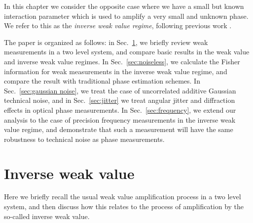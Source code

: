 In this chapter we consider the opposite case where we have a small but known interaction parameter which is used to amplify a very small and unknown phase.  We refer to this as the \emph{inverse weak value regime}, following previous work \cite{Starling2010a,Dressel2013,Lyons2015,Kofman2012}. 

The paper is organized as follows: in Sec.~\ref{sec:inverse weak values}, we briefly review weak measurements in a two level system, and compare basic results in the weak value and inverse weak value regimes.  In Sec.~\ref{sec:noiseless}, we calculate the Fisher information for weak measurements in the inverse weak value regime, and compare the result with traditional phase estimation schemes. In Sec.~\ref{sec:gaussian noise}, we treat the case of uncorrelated additive Gaussian technical noise, and in Sec.~\ref{sec:jitter} we treat angular jitter and diffraction effects in optical phase measurements.  In Sec.~\ref{sec:frequency}, we extend our analysis to the case of precision frequency measurements in the inverse weak value regime, and demonstrate that such a measurement will have the same robustness to technical noise as phase measurements.

\section{Inverse weak value}\label{sec:inverse weak values}
Here we briefly recall the usual weak value amplification process in a two level system, and then discuss how this relates to the process of amplification by the so-called inverse weak value.  

